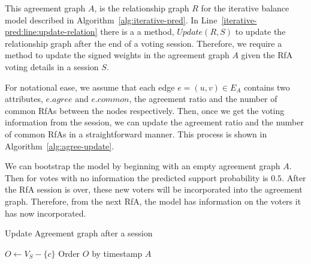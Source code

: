 This agreement graph $A$, is the relationship graph $R$ for the iterative balance model described in Algorithm~\ref{alg:iterative-pred}. 
In Line~\ref{iterative-pred:line:update-relation} there is a a method, $Update(R,S)$ to update the relationship graph after the end of a voting session.
Therefore, we require a method to update the signed weights in the agreement graph $A$ given the RfA voting details in a session $S$.

For notational ease, we assume that each edge $e = (u,v) \in E_{A}$ contains two attributes, $e.agree$ and $e.common$, the agreement ratio and the number of common RfAs between the nodes respectively.
Then, once we get the voting information from the session, we can update the agreement ratio and the number of common RfAs in a straightforward manner.
This process is shown in Algorithm~\ref{alg:agree-update}.

We can bootstrap the model by beginning with an empty agreement graph $A$.
Then for votes with no information the predicted support probability is $0.5$.
After the RfA session is over, these new voters will be incorporated into the agreement graph.
Therefore, from the next RfA, the model has information on the voters it has now incorporated.

\begin{algorithm}[htp]
    \DontPrintSemicolon
    \caption{Update Agreement graph after a session}
    \label{alg:agree-update}
    $O \leftarrow V_{S}-\{c\}$\;
    Order $O$ by timestamp\;
    \Return $A$
\end{algorithm}


